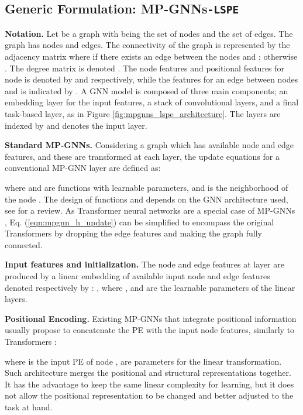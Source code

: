 \documentclass{article} \usepackage{iclr2021_conference,times}
\begin{document}
\subsection{Generic Formulation: MP-GNNs\texttt{-LSPE}}
\label{sec:generic_formulation}

{\bf Notation.} Let  be a graph with  being the set of nodes and  the set of edges. The graph has  nodes and  edges. The connectivity of the graph is represented by the adjacency matrix  where  if there exists an edge between the nodes  and ; otherwise . The degree matrix is denoted . The node features and positional features for node  is denoted by  and  respectively, while the features for an edge between nodes  and  is indicated by . A GNN model is composed of three main components; an embedding layer for the input features, a stack of convolutional layers, and a final task-based layer, as in Figure \ref{fig:mpgnns_lspe_architecture}.
The layers are indexed by  and  denotes the input layer.


{\bf Standard MP-GNNs.} Considering a graph which has available node and edge features, and
these are transformed at each layer, the update equations for a conventional MP-GNN layer are defined as:

where  and  are functions with learnable parameters, and  is the neighborhood of the node . The design of functions  and  depends on the GNN architecture used, see \cite{zhou2020graph} for a review.
As Transformer neural networks \citep{vaswani2017attention} are a special case of MP-GNNs \citep{joshi2020transformers}, Eq. (\ref{eqn:mpgnn_h_update}) can be simplified to encompass the original Transformers by dropping the edge features and making the graph fully connected.


{\bf Input features and initialization.} The node and edge features at layer  are produced by a linear embedding of available input node and edge features denoted respectively by : , 
where ,  and  are the learnable parameters of the linear layers.


{\bf Positional Encoding.} Existing MP-GNNs that integrate positional information usually 
propose to concatenate the PE with the input node features, similarly to Transformers \citep{vaswani2017attention}:

where  is the input PE of node ,  are parameters for the linear transformation. Such architecture merges the positional and structural representations together. It has the advantage to keep the same linear complexity for learning, but it does not allow the positional representation to be changed and better adjusted to the task at hand.
\end{document}
